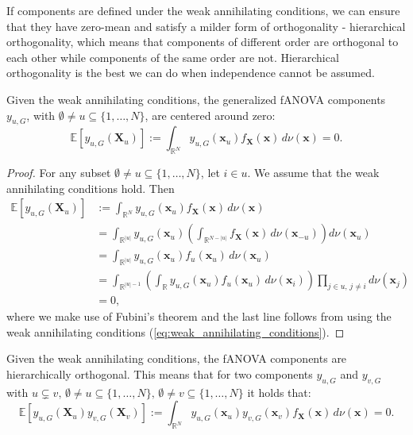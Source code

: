 If components are defined under the weak annihilating conditions, we can ensure that they have zero-mean and satisfy a milder form of orthogonality - hierarchical orthogonality, which means that components of different order are orthogonal to each other while components of the same order are not. Hierarchical orthogonality is the best we can do when independence cannot be assumed.
\begin{proposition}
    Given the weak annihilating conditions, the generalized fANOVA components $y_{u, G}$, with $\emptyset \neq u \subseteq \{1, \ldots, N\}$, are centered around zero:
\begin{equation}
    \mathbb{E}[y_{u, G}(\boldsymbol{X}_u)] := \int_{\mathbb{R}^N} y_{u, G}(\boldsymbol{x}_u) f_{\boldsymbol{X}}(\boldsymbol{x}) \, d\nu (\boldsymbol{x}) = 0.
    \label{eq:zero_mean_g}
\end{equation}
\end{proposition}

\begin{proof}
For any subset $\emptyset \ne u \subseteq \{1, \ldots, N\}$, let $i \in u$. We assume that the weak annihilating conditions hold. Then
\begin{align*}
\mathbb{E}[y_{u,G}(\boldsymbol{X}_u)] 
&:= \int_{\mathbb{R}^N} y_{u,G}(\boldsymbol{x}_u) f_{\boldsymbol{X}}(\boldsymbol{x})\, d \nu (\boldsymbol{x}) \\
&= \int_{\mathbb{R}^{|u|}} y_{u,G}(\boldsymbol{x}_u) \left( \int_{\mathbb{R}^{N - |u|}} f_{\boldsymbol{X}}(\boldsymbol{x}) \, d \nu(\boldsymbol{x}_{-u}) \right) d \nu(\boldsymbol{x}_u) \\
&= \int_{\mathbb{R}^{|u|}} y_{u,G}(\boldsymbol{x}_u) f_u(\boldsymbol{x}_u)\, d \nu(\boldsymbol{x}_u) \\
&= \int_{\mathbb{R}^{|u| - 1}} \left( \int_{\mathbb{R}} y_{u,G}(\boldsymbol{x}_u) f_u(\boldsymbol{x}_u) \, d \nu(\boldsymbol{x}_i) \right) \prod_{j \in u,\, j \ne i} d \nu(\boldsymbol{x}_j) \\
&= 0,
\end{align*}
where we make use of Fubini's theorem and the last line follows from using the weak annihilating conditions (\autoref{eq:weak_annihilating_conditions}).
\end{proof}

\begin{proposition}
    Given the weak annihilating conditions, the fANOVA components are hierarchically orthogonal. This means that for two components $y_{u, G}$ and $y_{v, G}$ with $u \subsetneq v, \, \emptyset \neq u \subseteq \{1, \ldots, N\}, \, \emptyset \neq v \subseteq \{1, \ldots, N\} $ it holds that:
\begin{equation}
    \mathbb{E}[y_{u, G}(\boldsymbol{X}_u)y_{v, G}(\boldsymbol{X}_v)] := \int_{\mathbb{R}^N} y_{u, G}(\boldsymbol{x}_u) y_{v, G}(\boldsymbol{x}_v) f_{\boldsymbol{X}}(\boldsymbol{x}) \, d\nu (\boldsymbol{x}) = 0.
\end{equation}
\label{eq:orthogonality_g}
\end{proposition}

